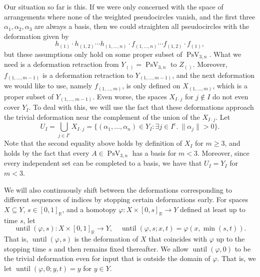 \documentclass[JEP,XML,SOM,Unicode,NoFloatCountersInSection,published]{cedram}
\theoremstyle{remark}
\let\mb\mathbb
\let\phi\varphi
\newcommand{\compl}[1]{{{#1}^{\text{c}}}}
\DeclareMathOperator{\pstief}{PsV}
\DeclareMathOperator{\upto}{until}
\begin{document}
Our situation so far is this.
If we were only concerned with the space of arrangements where none of the weighted pseudocircles vanish, and the first three $\alpha_1,\alpha_2,\alpha_3$ are always a basis, then we could straighten all pseudocircles with the deformation given by
\begin{equation}\label{deformation-naive}
h_{(1)} \cdot h_{(1,2)} \cdots h_{(1,\dots,n)} \cdot f_{(1,\dots,n)} \cdots f_{(1,2)} \cdot f_{(1)},
\end{equation}
but these assumptions only hold on some proper subset of $\pstief_{3,n}$.
What we need is a deformation retraction from $Y_{()} = \pstief_{3,n}$ to $Z_{()}$.
Moreover, $f_{(1,\dots,{m-1})}$ is a defor\-mation retraction to $Y_{(1,\dots,{m-1})}$, and the next deformation we would like to use, namely $f_{(1,\dots,m)}$, is only defined on $X_{(1,\dots,m)}$, which is a proper subset of $Y_{(1,\dots,{m-1})}$.
Even worse, the spaces $X_{I\cdot j}$ for $j \not\in I$ do not even cover $Y_I$.
To deal with this, we will use the fact that these deformations approach the trivial deformation near the complement of the union of the $X_{I\cdot j}$.
Let
\[ U_I = \bigcup_{j\in\compl{I}} X_{I\cdot j}
=\{ (\alpha_1,\dots,\alpha_n) \in Y_I:\exists j \in \compl{I}.\ \|\alpha_j\| > 0\}. \]
Note that the second equality above holds by definition of $X_I$ for $m \geq 3$, and holds by the fact that every $A \in \pstief_{3,n}$ has a basis for $m <3$.
Moreover, since every independent set can be completed to a basis, we have that $U_I = Y_I$ for $m < 3$.

We will also continuously shift between the deformations corresponding to different sequences of indices by stopping certain deformations early.
For spaces $X \subseteq Y$, \hbox{$s \in [0,1]_\mb{R}$}, and a homotopy $\phi:X \times [0,s]_\mb{R} \to Y$ defined at least up to time $s$, let
\[ \upto(\phi,s) : X \times [0,1]_\mb{R} \to Y, \quad \upto(\phi,s;x,t) = \phi(x,\min(s,t)). \]
That is, $\upto(\phi,s)$ is the deformation of $X$ that coincides with $\phi$ up to the stopping time $s$ and then remains fixed thereafter.
We allow $\upto(\phi,0)$ to be the trivial deformation even for input that is outside the domain of $\phi$.
That is, we let $\upto(\phi,0; y,t) = y$ for $y \in Y$.
\end{document}
